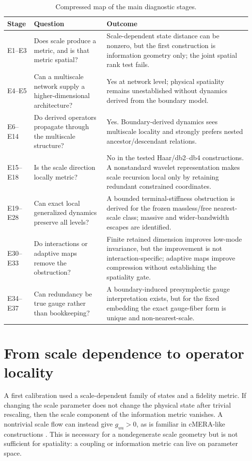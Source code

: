 \documentclass[11pt,a4paper]{article}
\begin{document}
\begin{table}[H]
\centering
\caption{Compressed map of the main diagnostic stages.}
\small
\begin{tabular}{p{1.4cm}p{5.0cm}p{7.1cm}}
\toprule
Stage & Question & Outcome \\
\midrule
E1--E3 & Does scale produce a metric, and is that metric spatial? & Scale-dependent state distance can be nonzero, but the first construction is information geometry only; the joint spatial rank test fails. \\
E4--E5 & Can a multiscale network supply a higher-dimensional architecture? & Yes at network level; physical spatiality remains unestablished without dynamics derived from the boundary model. \\
E6--E14 & Do derived operators propagate through the multiscale structure? & Yes. Boundary-derived dynamics sees multiscale locality and strongly prefers nested ancestor/descendant relations. \\
E15--E18 & Is the scale direction locally metric? & No in the tested Haar/db2--db4 constructions. A nonstandard wavelet representation makes scale recursion local only by retaining redundant constrained coordinates. \\
E19--E28 & Can exact local generalized dynamics preserve all levels? & A bounded terminal-stiffness obstruction is derived for the frozen massless/free nearest-scale class; massive and wider-bandwidth escapes are identified. \\
E30--E33 & Do interactions or adaptive maps remove the obstruction? & Finite retained dimension improves low-mode invariance, but the improvement is not interaction-specific; adaptive maps improve compression without establishing the spatiality gate. \\
E34--E37 & Can redundancy be true gauge rather than bookkeeping? & A boundary-induced presymplectic gauge interpretation exists, but for the fixed embedding the exact gauge-fiber form is unique and non-nearest-scale. \\
\bottomrule
\end{tabular}
\end{table}

\section{From scale dependence to operator locality}
A first calibration used a scale-dependent family of states and a fidelity metric. If changing the scale parameter does not change the physical state after trivial rescaling, then the scale component of the information metric vanishes. A nontrivial scale flow can instead give $g_{uu}>0$, as is familiar in cMERA-like constructions \cite{nozaki2012}. This is necessary for a nondegenerate scale geometry but is not sufficient for spatiality: a coupling or information metric can live on parameter space.
\end{document}
